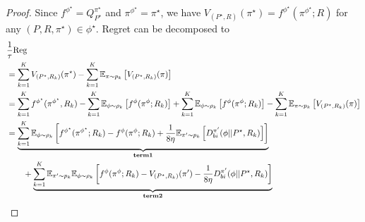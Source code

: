 \begin{proof}
Since  $f^{\phi^\star} = Q_{P^\star}^{\pi^\star}$ and $\pi^{\phi^\star} = \pi^\star$, we have $V_{(P^\star, R)}(\pi^\star) = f^{\phi^\star}(\pi^{\phi^\star}; R)$ for any $(P,R,\pi^\star) \in \phi^\star$. Regret can be decomposed to
\begin{align}
&\frac{1}{\tau}\text{\rmfamily Reg} \nonumber
\\&=\sum_{k=1}^K V_{(P^\star, R_k)}(\pi^\star)  - \sum_{k=1}^K \mathbb{E}_{\pi \sim p_k}\left[V_{(P^\star, R_k)}(\pi)\right] \nonumber
\\&= \sum_{k=1}^K f^{\phi^\star}(\pi^{\phi^\star}, R_k)  - \sum_{k=1}^K \mathbb{E}_{\phi \sim \rho_k}\left[f^{\phi}(\pi^{\phi}; R_k)\right]
 + \sum_{k=1}^K \mathbb{E}_{\phi \sim \rho_k}\left[f^{\phi}(\pi^{\phi}; R_k)\right]  -  \sum_{k=1}^K \mathbb{E}_{\pi \sim p_k}\left[V_{(P^\star, R_k)}(\pi)\right] \nonumber
 \\&= \underbrace{\sum_{k=1}^K \mathbb{E}_{\phi \sim \rho_k}\left[ f^{\phi^\star}(\pi^{\phi^\star}; R_k) - f^{\phi}(\pi^{\phi}; R_k)  + \frac{1}{8\eta} \mathbb{E}_{\pi' \sim p_k}\left[D_{bi}^{\pi'}(\phi||P^\star, R_k)\right]\right]}_{\textbf{term1}} \nonumber
\\&\qquad + \underbrace{\sum_{k=1}^K \mathbb{E}_{\pi' \sim p_k}\mathbb{E}_{\phi \sim \rho_k}\left[f^{\phi}(\pi^{\phi}; R_k) - V_{(P^\star, R_k)}(\pi') - \frac{1}{8\eta} D_{bi}^{\pi'}(\phi||P^\star, R_k)\right]}_{\textbf{term2}} \label{eq:reg-dec}
\end{align}



\end{proof}
